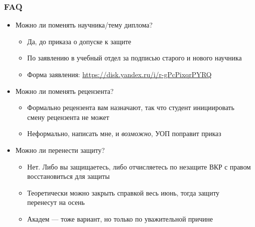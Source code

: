 \documentclass[xetex,mathserif,serif]{beamer}
\begin{document}
    \begin{frame}
        \frametitle{FAQ}
        \begin{itemize}
            \item Можно ли поменять научника/тему диплома?
            \begin{itemize}
                \item Да, до приказа о допуске к защите
                \item По заявлению в учебный отдел за подписью старого и нового научника 
                \item Форма заявления: \url{https://disk.yandex.ru/i/r-gPcPixqrPYRQ}
            \end{itemize}
            \item Можно ли поменять рецензента?
            \begin{itemize}
                \item Формально рецензента вам назначают, так что студент инициировать смену рецензента не может
                \item Неформально, написать мне, и \textit{возможно}, УОП поправит приказ
            \end{itemize}
            \item Можно ли перенести защиту?
            \begin{itemize}
                \item Нет. Либо вы защищаетесь, либо отчисляетесь по незащите ВКР с правом восстановиться для защиты
                \item Теоретически можно закрыть справкой весь июнь, тогда защиту перенесут на осень
                \item Академ --- тоже вариант, но только по уважительной причине
            \end{itemize}
        \end{itemize}
    \end{frame}
\end{document}
